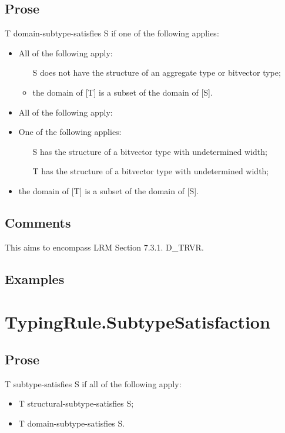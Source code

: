 \documentclass{book}
\begin{document}
\subsection{Prose}
 T domain-subtype-satisfies S if one of the following applies:
 \begin{itemize}
 \item  All of the following apply:
    \begin{itemize}
    \item  [S] does not have the structure of an aggregate type or bitvector type;
    \item  the domain of [T] is a subset of the domain of [S].
    \end{itemize}

  \item  All of the following apply:
    \item  One of the following applies:
      \begin{itemize}
      \item  [S] has the structure of a bitvector type with undetermined width;
      \item  [T] has the structure of a bitvector type with undetermined width;
      \end{itemize}
   \item  the domain of [T] is a subset of the domain of [S].
  \end{itemize}

\subsection{Comments}
  This aims to encompass LRM Section 7.3.1. D\_TRVR.

\subsection{Examples}

\section{TypingRule.SubtypeSatisfaction}

\subsection{Prose}
  T subtype-satisfies S if all of the following apply:
  \begin{itemize}
  \item  T structural-subtype-satisfies S;
  \item  T domain-subtype-satisfies S.
  \end{itemize} 
\end{document}
